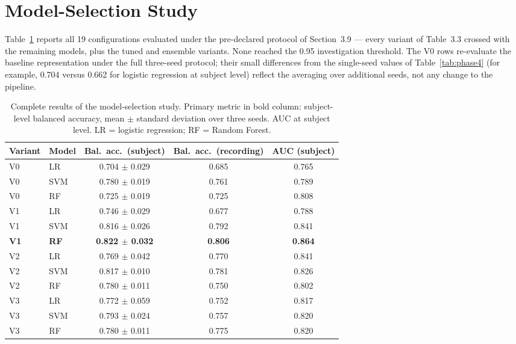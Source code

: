 \section{Model-Selection Study}

Table~\ref{tab:experiments} reports all 19 configurations evaluated
under the pre-declared protocol of Section~3.9 --- every variant of
Table~3.3 crossed with the remaining models, plus the tuned and
ensemble variants. None reached the 0.95 investigation threshold. The
V0 rows re-evaluate the baseline representation under the full
three-seed protocol; their small differences from the single-seed
values of Table~\ref{tab:phase4} (for example, 0.704 versus 0.662 for
logistic regression at subject level) reflect the averaging over
additional seeds, not any change to the pipeline.

\begin{table}[htb]
\centering
\caption{Complete results of the model-selection study. Primary metric
in bold column: subject-level balanced accuracy, mean $\pm$ standard
deviation over three seeds. AUC at subject level. LR = logistic
regression; RF = Random Forest.}
\label{tab:experiments}
\small
\setlength{\tabcolsep}{4pt}
\begin{tabular}{llccc}
\toprule
Variant & Model & \textbf{Bal.\ acc.\ (subject)} &
Bal.\ acc.\ (recording) & AUC (subject) \\
\midrule
V0 & LR        & 0.704 $\pm$ 0.029 & 0.685 & 0.765 \\
V0 & SVM       & 0.780 $\pm$ 0.019 & 0.761 & 0.789 \\
V0 & RF        & 0.725 $\pm$ 0.019 & 0.725 & 0.808 \\
\midrule
V1 & LR        & 0.746 $\pm$ 0.029 & 0.677 & 0.788 \\
V1 & SVM       & 0.816 $\pm$ 0.026 & 0.792 & 0.841 \\
\textbf{V1} & \textbf{RF} & \textbf{0.822 $\pm$ 0.032} & \textbf{0.806} & \textbf{0.864} \\
\midrule
V2 & LR        & 0.769 $\pm$ 0.042 & 0.770 & 0.841 \\
V2 & SVM       & 0.817 $\pm$ 0.010 & 0.781 & 0.826 \\
V2 & RF        & 0.780 $\pm$ 0.011 & 0.750 & 0.802 \\
\midrule
V3 & LR        & 0.772 $\pm$ 0.059 & 0.752 & 0.817 \\
V3 & SVM       & 0.793 $\pm$ 0.024 & 0.757 & 0.820 \\
V3 & RF        & 0.780 $\pm$ 0.011 & 0.775 & 0.820 \\

\end{tabular}
\end{table}
